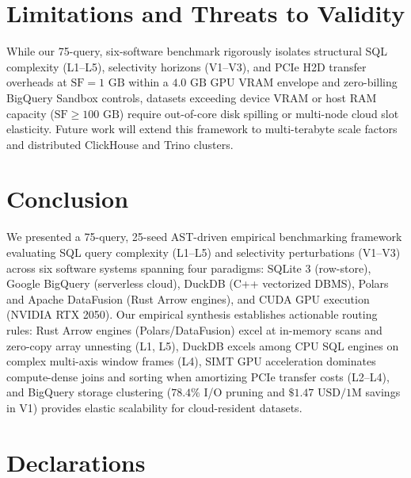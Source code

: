 \documentclass[10pt,a4paper]{article}
\begin{document}
\section{Limitations and Threats to Validity}
While our 75-query, six-software benchmark rigorously isolates structural SQL complexity (L1--L5), selectivity horizons (V1--V3), and PCIe H2D transfer overheads at $\text{SF}=1\text{ GB}$ within a $4.0\text{ GB}$ GPU VRAM envelope and zero-billing BigQuery Sandbox controls, datasets exceeding device VRAM or host RAM capacity ($\text{SF} \ge 100\text{ GB}$) require out-of-core disk spilling or multi-node cloud slot elasticity. Future work will extend this framework to multi-terabyte scale factors and distributed ClickHouse and Trino clusters.

\section{Conclusion}
We presented a 75-query, 25-seed AST-driven empirical benchmarking framework evaluating SQL query complexity (L1--L5) and selectivity perturbations (V1--V3) across six software systems spanning four paradigms: SQLite 3 (row-store), Google BigQuery (serverless cloud), DuckDB (C++ vectorized DBMS), Polars and Apache DataFusion (Rust Arrow engines), and CUDA GPU execution (NVIDIA RTX 2050). Our empirical synthesis establishes actionable routing rules: Rust Arrow engines (Polars/DataFusion) excel at in-memory scans and zero-copy array unnesting (L1, L5), DuckDB excels among CPU SQL engines on complex multi-axis window frames (L4), SIMT GPU acceleration dominates compute-dense joins and sorting when amortizing PCIe transfer costs (L2--L4), and BigQuery storage clustering ($78.4\%$ I/O pruning and $\$1.47\text{ USD/1M}$ savings in V1) provides elastic scalability for cloud-resident datasets.

\section*{Declarations}
\end{document}
